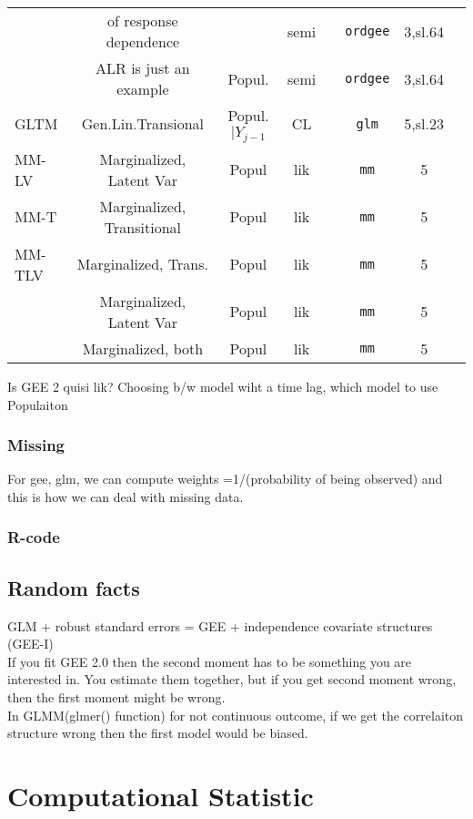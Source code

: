 \documentclass[]{article}
\begin{document}
\begin{tabular}{|l|| c| c | c |c|c|c|c}
	   & of response dependence  &  &semi &   &  \texttt{ordgee}  &  3,sl.64   &     \\
	    & ALR is just an example  &  Popul.  &semi &   &  \texttt{ordgee}  &  3,sl.64   &     \\
	  \hline
	  GLTM & Gen.Lin.Transional  & Popul.$|Y_{j-1}$ & CL  &   &   \texttt{glm} &  5,sl.23   &    \\
	  \hline
	  MM-LV & Marginalized, Latent Var  & Popul &lik  &   &   \texttt{mm} &  5  &    \\
	  \hline
	  MM-T &  Marginalized, Transitional  & Popul &lik  &   &  \texttt{mm} &  5   &     \\
	  \hline
	  MM-TLV &  Marginalized, Trans.    & Popul &lik  &   &  \texttt{mm}  &  5  &     \\
	    &  Marginalized,   Latent Var   & Popul &lik  &   &  \texttt{mm}  &  5  &     \\
	    &  Marginalized, both   & Popul &lik  &   &  \texttt{mm}  &  5  &     \\
	  \hline
	  \hline
	  \hline
	\end{tabular}

Is GEE 2 quisi lik?
Choosing b/w model wiht a time lag, which model to use \\
Populaiton

	\subsubsection{Missing}
	For gee, glm, we can compute weights =1/(probability of being observed) and this is how we can deal with missing data.
	\subsubsection{R-code}

\subsection{Random facts}
GLM + robust standard errors = GEE + independence covariate structures (GEE-I)\\
If you fit GEE 2.0 then the second moment has to be something you are interested in. You estimate them together, but if you get second moment wrong, then the first moment might be wrong.\\
In GLMM(glmer() function) for not continuous outcome, if we get the correlaiton structure wrong then the first model would be biased.

\section{Computational Statistic}
\end{document}
